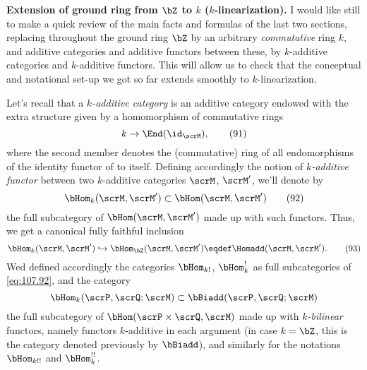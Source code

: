 \bigbreak
\presectionfill{}\par

\label{sec:107}%
%
\textbf{\enspace Extension of ground ring
  from $\bZ$ to $k$ ($k$-linearization).}\enspace%
I would like still to make a quick review of the main facts and
formulas of the last two sections, replacing throughout the ground
ring $\bZ$ by an arbitrary \emph{commutative} ring $k$, and additive
categories \scrM{} and additive functors between these, by
$k$-additive categories and $k$-additive functors. This will allow us
to check that the conceptual and notational set-up we got so far
extends smoothly to $k$-linearization.

Let's recall that a \emph{$k$-additive category} \scrM{}
is an additive category endowed with the extra structure given by a
homomorphism of commutative rings
\begin{equation}
  \label{eq:107.91}
  k\to\End(\id_\scrM),\tag{91}
\end{equation}
where the second member denotes the (commutative) ring of all
endomorphisms of the identity functor of \scrM{} to itself. Defining
accordingly the notion of \emph{$k$-additive functor} between two
$k$-additive categories $\scrM$, $\scrM'$, we'll denote by
\begin{equation}
  \label{eq:107.92}
  \bHom_k(\scrM,\scrM')\subset\bHom(\scrM,\scrM')\tag{92}
\end{equation}
the full subcategory of $\bHom(\scrM,\scrM')$ made up with such
functors. Thus, we get a canonical fully faithful inclusion
\begin{equation}
  \label{eq:107.93}
  \bHom_k(\scrM,\scrM') \hookrightarrow \bHom_{\bZ}(\scrM,\scrM')
  \eqdef \Homadd(\scrM,\scrM').\tag{93}
\end{equation}
Wed defined accordingly the categories $\bHom_{k!}$, $\bHom_k^!$ as
full subcategories of \eqref{eq:107.92}, and the category
\[\bHom_k(\scrP,\scrQ;\scrM) \subset \bBiadd(\scrP,\scrQ;\scrM)\]
the full subcategory of $\bHom(\scrP\times\scrQ,\scrM)$ made up with
\emph{$k$-bilinear} functors, namely functors $k$-additive in each
argument (in case $k=\bZ$, this is the
category denoted previously by $\bBiadd$), and similarly for the
notations $\bHom_{k!!}$ and $\bHom_k^{!!}$.

